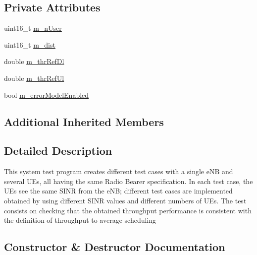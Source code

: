 \subsection*{Private Attributes}
\begin{DoxyCompactItemize}
\item 
uint16\+\_\+t \hyperlink{classLenaTtaFfMacSchedulerTestCase_a62553f6f986f9e498a77482da9e649c5}{m\+\_\+n\+User}
\item 
uint16\+\_\+t \hyperlink{classLenaTtaFfMacSchedulerTestCase_a1017fe2567e0c80556ff9bbaa76176c5}{m\+\_\+dist}
\item 
double \hyperlink{classLenaTtaFfMacSchedulerTestCase_ad7f0b52852942992345df07a4db4bd3a}{m\+\_\+thr\+Ref\+Dl}
\item 
double \hyperlink{classLenaTtaFfMacSchedulerTestCase_a451f6b6555e9901f3b362fe213cb4127}{m\+\_\+thr\+Ref\+Ul}
\item 
bool \hyperlink{classLenaTtaFfMacSchedulerTestCase_a74d353210829b60935ec66f0777d53b1}{m\+\_\+error\+Model\+Enabled}
\end{DoxyCompactItemize}
\subsection*{Additional Inherited Members}


\subsection{Detailed Description}
This system test program creates different test cases with a single e\+NB and several U\+Es, all having the same Radio Bearer specification. In each test case, the U\+Es see the same S\+I\+NR from the e\+NB; different test cases are implemented obtained by using different S\+I\+NR values and different numbers of U\+Es. The test consists on checking that the obtained throughput performance is consistent with the definition of throughput to average scheduling 

\subsection{Constructor \& Destructor Documentation}

